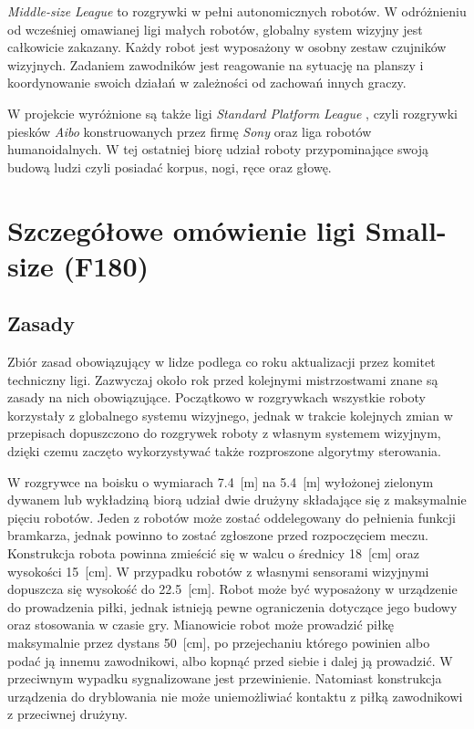 	\emph{Middle-size League} to rozgrywki w pełni autonomicznych robotów. W odróżnieniu od wcześniej omawianej
	ligi małych robotów, globalny system wizyjny jest całkowicie zakazany. Każdy robot jest wyposażony w osobny zestaw czujników wizyjnych.
	Zadaniem zawodników jest reagowanie na sytuację na planszy i koordynowanie swoich działań w zależności od zachowań innych graczy.

	W projekcie wyróżnione są także ligi \emph{Standard Platform League }, czyli rozgrywki piesków \textit{Aibo} konstruowanych przez firmę \textit{Sony} oraz 
	liga robotów humanoidalnych. W tej ostatniej biorę udział roboty przypominające swoją budową ludzi czyli posiadać korpus, nogi, ręce oraz głowę.
	\section{Szczegółowe omówienie ligi Small-size (F180)}
	\subsection{Zasady}
	Zbiór zasad obowiązujący w lidze podlega co roku aktualizacji przez komitet techniczny ligi. Zazwyczaj około
	rok przed kolejnymi mistrzostwami znane są zasady na nich obowiązujące. Początkowo w rozgrywkach wszystkie
	roboty  korzystały  z globalnego systemu wizyjnego, jednak w  trakcie kolejnych zmian w przepisach
	dopuszczono do rozgrywek roboty z własnym systemem wizyjnym, dzięki czemu  zaczęto wykorzystywać także
	rozproszone algorytmy sterowania.
	
	W rozgrywce na boisku o wymiarach 7.4~[m] na 5.4~[m] wyłożonej zielonym dywanem lub wykładziną biorą udział dwie
	drużyny składające się z maksymalnie pięciu robotów. Jeden z robotów może zostać oddelegowany do pełnienia
	funkcji bramkarza, jednak powinno to zostać zgłoszone przed rozpoczęciem meczu. 
	Konstrukcja robota powinna zmieścić się w walcu o średnicy 18~[cm] oraz wysokości 15~[cm]. W przypadku robotów z
	własnymi sensorami wizyjnymi dopuszcza się wysokość do 22.5~[cm]. Robot może być wyposażony w urządzenie do prowadzenia piłki, jednak istnieją pewne ograniczenia dotyczące
	jego budowy oraz stosowania w czasie gry. Mianowicie robot może prowadzić piłkę maksymalnie przez dystans
	50~[cm], po przejechaniu którego powinien albo podać ją innemu zawodnikowi, albo kopnąć przed siebie i dalej ją
	prowadzić. W przeciwnym wypadku sygnalizowane jest przewinienie. Natomiast konstrukcja urządzenia do dryblowania nie może uniemożliwiać kontaktu z piłką zawodnikowi z przeciwnej drużyny.
		
